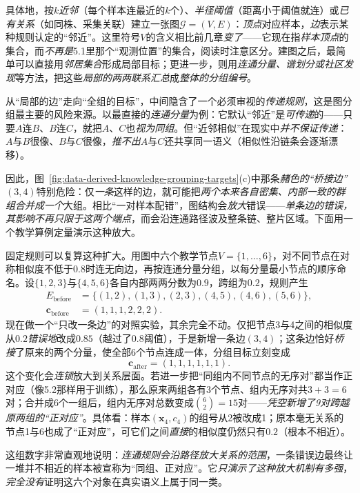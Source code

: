 具体地，按\emph{$k$近邻}（每个样本连最近的$k$个）、\emph{半径阈值}（距离小于阈值就连）或\emph{已有关系}（如同株、采集关联）建立一张图$\mathcal{G}=(V,E)$：\emph{顶点}对应样本，\emph{边}表示某种规则认定的“邻近”。这里符号$V$的含义相比前几章\emph{变了}——它现在指\emph{样本顶点}的集合，而\emph{不再是}5.1里那个“观测位置”的集合，阅读时注意区分。建图之后，最简单可以直接用\emph{邻居集合}形成局部目标；更进一步，则用\emph{连通分量、谱划分或社区发现}等方法，把这些\emph{局部的两两联系汇总}成\emph{整体的分组编号}。

从“局部的边”走向“全组的目标”，中间隐含了一个必须审视的\emph{传递规则}，这是图分组最主要的风险来源。以最直接的\emph{连通分量}为例：它默认“邻近”是\emph{可传递}的——只要$A$连$B$、$B$连$C$，就把$A$、$C$也\emph{视为同组}。但“近邻相似”在现实中\emph{并不保证传递}：$A$与$B$很像、$B$与$C$很像，\emph{推不出}$A$与$C$还共享同一语义（相似性沿链条会逐渐漂移）。

因此，图~\ref{fig:data-derived-knowledge-grouping-targets}(c)中那条\emph{赭色的“桥接边”}$(3,4)$特别危险：仅\emph{一条}这样的边，就可能把\emph{两个本来各自密集、内部一致的群组合并成一个}大组。相比“一对样本配错”，图结构会\emph{放大}错误——\emph{单条边的错误，其影响不再只限于这两个端点}，而会沿连通路径波及整条链、整片区域。下面用一个教学算例定量演示这种放大。

固定规则可以复算这种扩大。用图中六个教学节点$V=\{1,\ldots,6\}$，对不同节点在对称相似度不低于$0.8$时连无向边，再按连通分量分组，以每分量最小节点的顺序命名。设$\{1,2,3\}$与$\{4,5,6\}$各自内部两两分数为$0.9$，跨组为$0.2$，规则产生
\[
  \begin{aligned}
    E_{\mathrm{before}}
    &=\{(1,2),(1,3),(2,3),(4,5),(4,6),(5,6)\},\\
    \bm{c}_{\mathrm{before}}&=(1,1,1,2,2,2).
  \end{aligned}
\]
现在做一个“只改一条边”的对照实验，其余完全不动。仅把节点3与4之间的相似度从$0.2$\emph{错误地}改成$0.85$（越过了0.8阈值），于是新增一条边$(3,4)$；这条边恰好\emph{桥接}了原来的两个分量，使全部6个节点连成一体，分组目标立刻变成
\[
  \bm{c}_{\mathrm{after}}=(1,1,1,1,1,1).
\]
这个变化会\emph{连锁}放大到关系层面。若进一步把“同组内不同节点的无序对”都当作正对应（像5.2那样用于训练），那么原来两组各有3个节点、组内无序对共$3+3=6$对；合并成6个一组后，组内无序对总数变成$\binom{6}{2}=15$对——\emph{凭空新增了9对跨越原两组的“正对应”}。具体看：样本$(\bm{x}_4,c_4)$的组号从2被改成1；原本毫无关系的节点1与6也成了“正对应”，可它们之间\emph{直接}的相似度仍然只有$0.2$（根本不相近）。

这组数字非常直观地说明：\emph{连通规则会沿路径放大关系的范围}，一条错误边最终让一堆并不相近的样本被宣称为“同组、正对应”。它\emph{只演示了这种放大机制有多强}，\emph{完全没有}证明这六个对象在真实语义上属于同一类。

